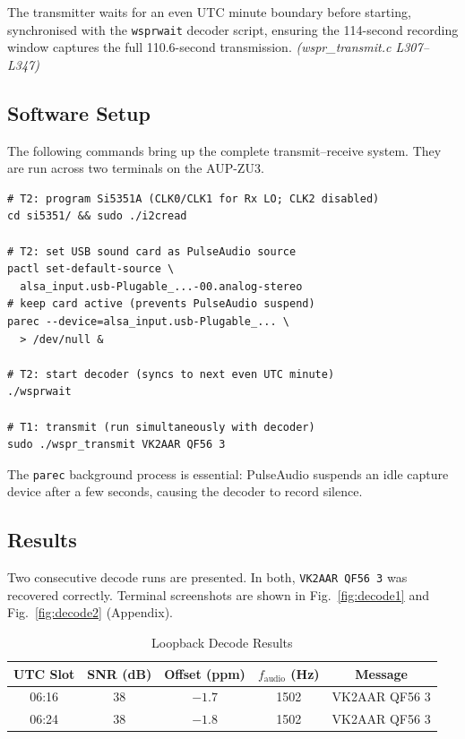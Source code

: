\documentclass[conference]{IEEEtran}
\begin{document}
The transmitter waits for an even UTC minute boundary before starting, synchronised
with the \texttt{wsprwait} decoder script, ensuring the 114-second recording window
captures the full 110.6-second transmission.
\textit{(wspr\_transmit.c L307--L347)}

\subsection{Software Setup}

The following commands bring up the complete transmit--receive system. They are run
across two terminals on the AUP-ZU3.

\begin{lstlisting}
# T2: program Si5351A (CLK0/CLK1 for Rx LO; CLK2 disabled)
cd si5351/ && sudo ./i2cread

# T2: set USB sound card as PulseAudio source
pactl set-default-source \
  alsa_input.usb-Plugable_...-00.analog-stereo
# keep card active (prevents PulseAudio suspend)
parec --device=alsa_input.usb-Plugable_... \
  > /dev/null &

# T2: start decoder (syncs to next even UTC minute)
./wsprwait

# T1: transmit (run simultaneously with decoder)
sudo ./wspr_transmit VK2AAR QF56 3
\end{lstlisting}

The \texttt{parec} background process is essential: PulseAudio suspends an idle
capture device after a few seconds, causing the decoder to record silence.

\subsection{Results}

Two consecutive decode runs are presented. In both, \texttt{VK2AAR QF56 3} was
recovered correctly. Terminal screenshots are shown in Fig.~\ref{fig:decode1} and
Fig.~\ref{fig:decode2} (Appendix).


\begin{table}[H]
  \centering
  \caption{Loopback Decode Results}
  \label{tab:results}
  \begin{tabular}{ccccc}
    \toprule
    UTC Slot & SNR (dB) & Offset (ppm) & $f_\text{audio}$ (Hz) & Message \\
    \midrule
    06:16 & 38 & $-1.7$ & 1502 & VK2AAR QF56 3 \\
    06:24 & 38 & $-1.8$ & 1502 & VK2AAR QF56 3 \\
    \bottomrule
  \end{tabular}
\end{table}
\end{document}
